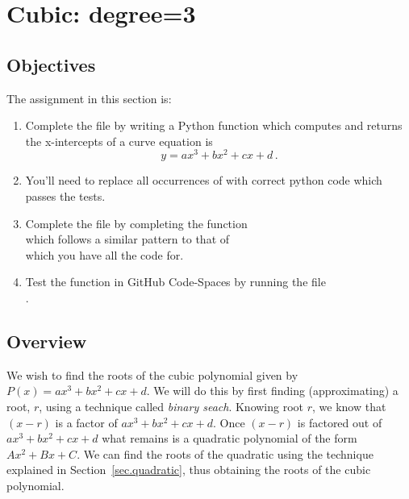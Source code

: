 \section{Cubic: degree=3}
\label{sec.cubic}

\subsection{Objectives}
The assignment in this section is:
\begin{enumerate}
\item Complete the file  by writing a Python
  function which computes and returns the x-intercepts of a curve
  equation is \[y=a x^3 + b x^2 + c x + d\,.\]
\item You'll need to replace all occurrences of 
  with correct python code which passes the tests.

\item Complete the file  by completing the function \\
  which follows a similar pattern to that of \\
   which you have all the code for.

\item Test the function in GitHub Code-Spaces by running the file\\
  .
\end{enumerate}

\subsection{Overview}

We wish to find the roots of the cubic polynomial given by $P(x) = a
x^3 + b x^2 + c x + d$.  We will do this by first finding
(approximating) a root, $r$, using a technique called \emph{binary
seach}.  Knowing root $r$, we know that $(x-r)$ is a factor of $a x^3
+ b x^2 + c x + d$.  Once $(x-r)$ is factored out of $a x^3 + b x^2 + c x + d$
what remains is a quadratic polynomial of the form $A x^2 + Bx + C$.
We can find the roots of the quadratic using the technique
explained in Section~\ref{sec.quadratic}, thus obtaining the roots of
the cubic polynomial.


